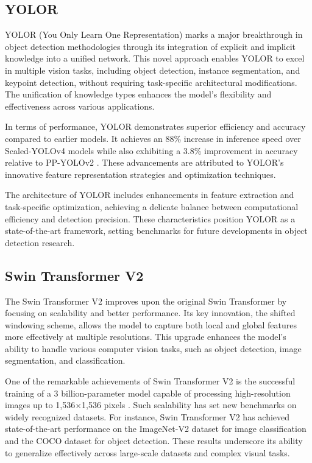 \documentclass[3p,times]{elsarticle}
\begin{document}
\subsection{YOLOR}

YOLOR (You Only Learn One Representation) marks a major breakthrough in object detection methodologies through its integration of explicit and implicit knowledge into a unified network. This novel approach enables YOLOR to excel in multiple vision tasks, including object detection, instance segmentation, and keypoint detection, without requiring task-specific architectural modifications. The unification of knowledge types enhances the model's flexibility and effectiveness across various applications.

In terms of performance, YOLOR demonstrates superior efficiency and accuracy compared to earlier models. It achieves an 88\% increase in inference speed over Scaled-YOLOv4 models while also exhibiting a 3.8\% improvement in accuracy relative to PP-YOLOv2 \cite{wang2021learnrepresentationunifiednetwork}. These advancements are attributed to YOLOR's innovative feature representation strategies and optimization techniques.

The architecture of YOLOR includes enhancements in feature extraction and task-specific optimization, achieving a delicate balance between computational efficiency and detection precision. These characteristics position YOLOR as a state-of-the-art framework, setting benchmarks for future developments in object detection research.


\subsection{Swin Transformer V2}

The Swin Transformer V2 improves upon the original Swin Transformer by focusing on scalability and better performance. Its key innovation, the shifted windowing scheme, allows the model to capture both local and global features more effectively at multiple resolutions. This upgrade enhances the model's ability to handle various computer vision tasks, such as object detection, image segmentation, and classification.

One of the remarkable achievements of Swin Transformer V2 is the successful training of a 3 billion-parameter model capable of processing high-resolution images up to 1,536×1,536 pixels \cite{liu2022swintransformerv2scaling}. Such scalability has set new benchmarks on widely recognized datasets. For instance, Swin Transformer V2 has achieved state-of-the-art performance on the ImageNet-V2 dataset for image classification and the COCO dataset for object detection. These results underscore its ability to generalize effectively across large-scale datasets and complex visual tasks.
\end{document}
